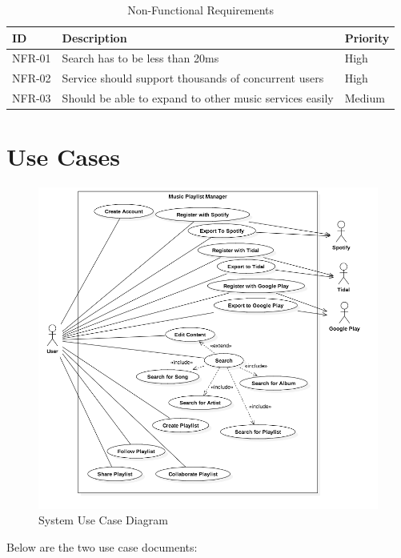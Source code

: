 \documentclass[12pt]{article}
\begin{document}
	\begin{table}[H]
		\centering
		\label{tab:nfr}
		\caption*{Non-Functional Requirements}
		\begin{tabularx}{450pt}{lXl}
			ID & Description & Priority\\\hline
			NFR-01 & Search has to be less than 20ms & High \\
			NFR-02 & Service should support thousands of concurrent users & High \\
			NFR-03 & Should be able to expand to other music services easily & Medium \\
		\end{tabularx}
	\end{table}
	\section*{Use Cases}
	\begin{figure}[H]
		\includegraphics[scale=0.4]{SystemUseCase}
		\caption{System Use Case Diagram}
		\label{fig:sucd}
	\end{figure}
	Below are the two use case documents:
	
\end{document}
